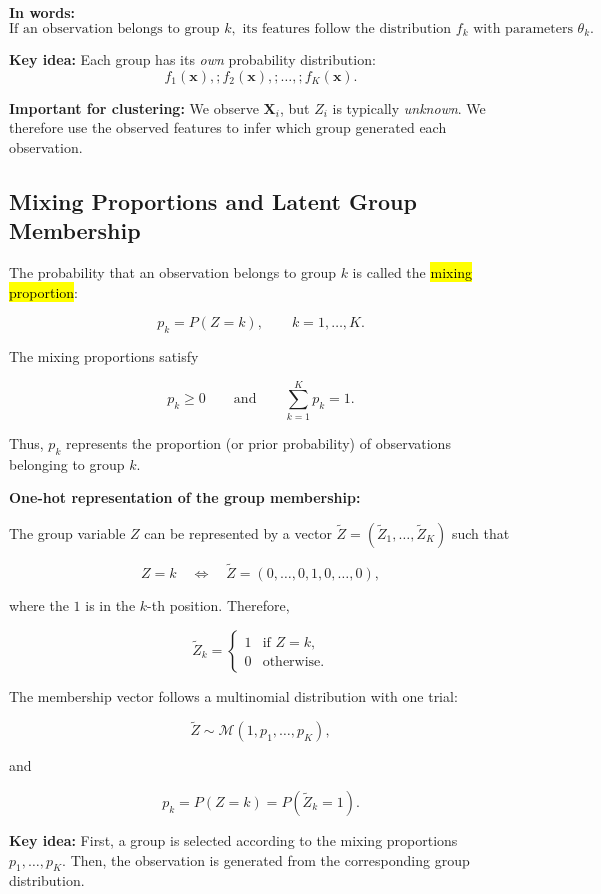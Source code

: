 \documentclass[a4paper,11pt]{article}
\begin{document}
\textbf{In words:}
\[
\boxed{\text{If an observation belongs to group }k,
\text{ its features follow the distribution }f_k
\text{ with parameters }\theta_k.}
\]

\textbf{Key idea:} Each group has its \emph{own} probability distribution:
\[
f_1(\mathbf{x}),;f_2(\mathbf{x}),;\ldots,;f_K(\mathbf{x}).
\]

\textbf{Important for clustering:} We observe $\bm{X}_i$, but $Z_i$ is typically
\emph{unknown}. We therefore use the observed features to infer which group
generated each observation.

\subsection{Mixing Proportions and Latent Group Membership}

The probability that an observation belongs to group $k$ is called the
\hl{mixing proportion}:

$$
p_k=P(Z=k),
\qquad k=1,\ldots,K.
$$

The mixing proportions satisfy

$$
p_k\geq 0
\qquad\text{and}\qquad
\sum_{k=1}^K p_k=1.
$$

Thus, $p_k$ represents the proportion (or prior probability) of observations
belonging to group $k$.

\medskip

\textbf{One-hot representation of the group membership:}

The group variable $Z$ can be represented by a vector
$\tilde{Z}=(\tilde{Z}_1,\ldots,\tilde{Z}_K)$ such that

$$
Z=k
\quad\Longleftrightarrow\quad
\tilde{Z}=(0,\ldots,0,1,0,\ldots,0),
$$

where the $1$ is in the $k$-th position. Therefore,

$$
\tilde{Z}_k=
\begin{cases}
1 & \text{if } Z=k,\\
0 & \text{otherwise.}
\end{cases}
$$

The membership vector follows a multinomial distribution with one trial:

$$
\tilde{Z}\sim\mathcal{M}(1,p_1,\ldots,p_K),
$$

and

$$
p_k=P(Z=k)=P(\tilde{Z}_k=1).
$$

\textbf{Key idea:} First, a group is selected according to the mixing
proportions $p_1,\ldots,p_K$. Then, the observation is generated from the
corresponding group distribution.
\end{document}
